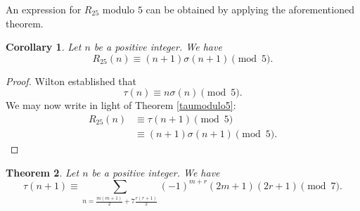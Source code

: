 \documentclass[10pt]{article}
\newtheorem{theorem}{Theorem}[section]
\newtheorem{corollary}[theorem]{Corollary}
\theoremstyle{definition}
\begin{document}
An expression for $R_{25}$ modulo $5$ can be obtained by applying the aforementioned theorem.
\begin{corollary}
Let $n$ be a positive integer. We have
\begin{equation}
R_{25}(n)\equiv (n+1)\sigma(n+1)\pmod{5}.
\end{equation}
\end{corollary}
\begin{proof}
Wilton \cite{wilton} established that 
\begin{equation*}
\tau(n)\equiv n\sigma(n)\pmod{5}.
\end{equation*}
We may now write in light of Theorem \ref{taumodulo5}:
\begin{align*}
R_{25}(n)&\equiv \tau(n+1)\pmod{5}\\
&\equiv (n+1)\sigma(n+1)\pmod{5}.
\end{align*}
\end{proof}
\begin{theorem}\label{taumodulo7}
Let $n$ be a positive integer. We have
\begin{equation}
\tau(n+1)\equiv \sum_{n=\frac{m(m+1)}{2}+7\frac{r(r+1)}{2}}(-1)^{m+r}(2m+1)(2r+1)\pmod{7}.
\end{equation}
\end{theorem}
\end{document}

